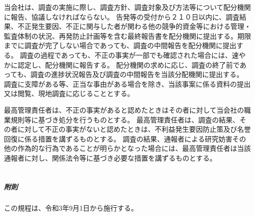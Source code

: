 \documentclass[10pt,a4paper,uplatex]{jsarticle}
\begin{document}
当会社は、調査の実施に際し、調査方針、調査対象及び方法等について配分機関に報告、協議しなければならない。
\term 告発等の受付から２１０日以内に、調査結果、不正発生要因、不正に関与した者が関わる他の競争的資金等における管理・監査体制の状況、再発防止計画等を含む最終報告書を配分機関に提出する。期限までに調査が完了しない場合であっても、調査の中間報告を配分機関に提出する。
\term 調査の過程であっても、不正の事実が一部でも確認された場合には、速やかに認定し、配分機関に報告する。
\term 配分機関の求めに応じ、調査の終了前であっても、調査の進捗状況報告及び調査の中間報告を当該分配機関に提出する。
\term 調査に支障がある等、正当な事由がある場合を除き、当該事案に係る資料の提出又は閲覧、現地調査に応じることとする。

最高管理責任者は、不正の事実があると認めたときはその者に対して当会社の職業規則等に基づき処分を行うものとする。
\term 最高管理責任者は、調査の結果、その者に対して不正の事実がないと認めたときは、不利益発生要因防止策及び名誉回復に係る措置を講ずるものとする。
\term 調査の結果、通報者による研究妨害その他の作為的な行為であることが明らかとなった場合には、最高管理責任者は当該通報者に対し、関係法令等に基づき必要な措置を講ずるものとする。\\
\\
\subparagraph{附則}
この規程は、令和3年9月1日から施行する。
\end{document}
